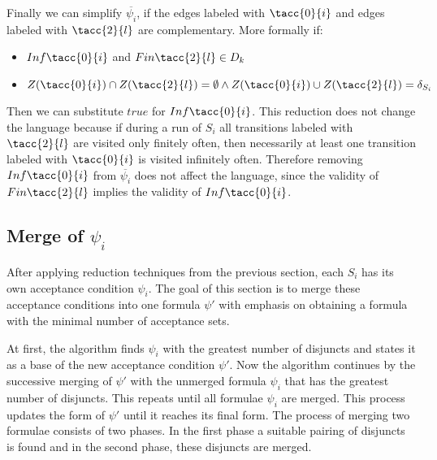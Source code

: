 \documentclass[a4paper,UKenglish,cleveref, autoref, thm-restate]{lipics-v2021}
\def\Inf{\ensuremath{\mathsf{Inf}}}
\def\Fin{\ensuremath{\mathsf{Fin}}}
\def\true{\mathit{true}}
\begin{document}
Finally we can simplify $\overline{\psi_{i}}$, if the edges labeled with $\tacc{0}{i}$ and edges labeled with $\tacc{2}{l}$ are complementary.
More formally if:
\begin{itemize}
    \item  $\Inf\tacc{0}{i}$ and $\Fin\tacc{2}{l} \in D_{k}$
    \item $Z(\tacc{0}{i}) \cap Z(\tacc{2}{l}) = \emptyset \land Z(\tacc{0}{i}) \cup Z(\tacc{2}{l}) = \delta_{S_{i}} $
\end{itemize}
Then we can substitute $\true$ for $\Inf\tacc{0}{i}$.
This reduction does not change the language because if during a run of $S_{i}$ all transitions labeled with $\tacc{2}{l}$ are visited only finitely often, then necessarily at least one transition labeled with $\tacc{0}{i}$ is visited infinitely often. Therefore removing $\Inf\tacc{0}{i}$ from $\overline{\psi_{i}}$ does not affect the language, since the validity of $\Fin\tacc{2}{l}$ implies the validity of $\Inf\tacc{0}{i}$.

\subsection{Merge of $\psi_{i}$}
After applying reduction techniques from the previous section, each $S_{i}$ has its own acceptance condition $\psi_{i}$. The goal of this section is to merge these acceptance conditions into one formula $\psi'$ with emphasis on obtaining a formula with the minimal number of acceptance sets.

At first, the algorithm finds $\psi_{i}$ with the greatest number of disjuncts and states it as a base of the new acceptance condition $\psi'$. Now the algorithm continues by the successive merging of $\psi'$ with the unmerged formula $\psi_{i}$ that has the greatest number of disjuncts. This repeats until all formulae $\psi_{i}$ are merged. This process updates the form of $\psi'$ until it reaches its final form. The process of merging two formulae consists of two phases. In the first phase a suitable pairing of disjuncts is found and in the second phase, these disjuncts are merged.
\end{document}
